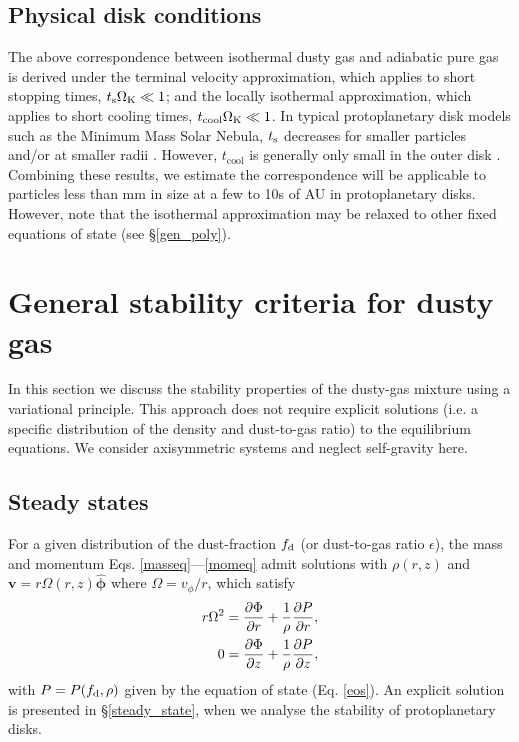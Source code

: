 \subsection{Physical disk conditions}
The above correspondence between isothermal dusty gas and adiabatic
pure gas is derived under the terminal velocity approximation, which applies
to short stopping times, $t_\mathrm{s}\Omega_{\rm K}\ll 1$; and the locally isothermal
approximation, which applies to short cooling times, $t_\mathrm{cool}\Omega_{\rm K}\ll
1$. In typical protoplanetary disk
models such as the Minimum Mass Solar Nebula, $t_\mathrm{s}$ decreases for
smaller particles and/or at smaller radii \citep{youdin11}. However,
$t_\mathrm{cool}$ is generally only small in the outer disk
\citep{lin15,malygin17}. Combining these results, we estimate the 
correspondence will be applicable to particles less than mm in size at a few
to 10s of AU in protoplanetary disks. However, note that the
isothermal approximation may be relaxed to other fixed equations of
state (see \S\ref{gen_poly}). 


\section{General stability criteria for dusty gas}\label{limits}

In this section we discuss the stability properties of the 
dusty-gas mixture using a variational principle. This approach does not
require explicit solutions (i.e. a specific distribution of the density and dust-to-gas ratio)  
to the equilibrium equations. We consider axisymmetric systems and neglect self-gravity here.  

\subsection{Steady states}\label{eqm}

For a given distribution of the dust-fraction $f_\mathrm{d}$ (or
dust-to-gas ratio $\epsilon$), the 
mass and momentum Eqs. \ref{masseq}---\ref{momeq} admit     
solutions with $\rho(r,z)$ and 
$\bm{v}=r\Omega(r,z)\hat{\bm{\phi}}$ where $\Omega = v_\phi/r$, which satisfy 
\begin{align}
  r\Omega^2 &= \frac{\partial \Phi}{\partial r} + \frac{1}{\rho}\frac{\partial P}{\partial
    r},\label{steady_momr}\\
  0 & = \frac{\partial\Phi}{\partial z} + \frac{1}{\rho}\frac{\partial P}{\partial z},\label{steady_momz}
\end{align}
with $P=P(f_\mathrm{d},\rho)$ given by the equation of state
(Eq. \ref{eos}). An explicit solution is presented in 
\S\ref{steady_state}, when we analyse the stability of
protoplanetary disks. 

